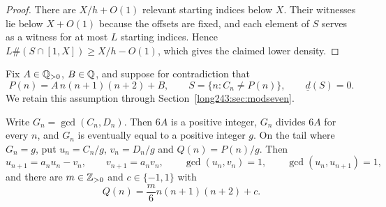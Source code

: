 \documentclass[11pt]{article}
\begin{document}
\begin{proof}
There are $X/h+O(1)$ relevant starting indices below $X$. Their witnesses
lie below $X+O(1)$ because the offsets are fixed, and each element of $S$
serves as a witness for at most $L$ starting indices. Hence
$L\#(S\cap[1,X])\ge X/h-O(1)$, which gives the claimed lower density.
\end{proof}

Fix $A\in\mathbb{Q}_{>0}$, $B\in\mathbb{Q}$, and suppose for contradiction that
\[
 P(n)=A\,n(n+1)(n+2)+B,
 \qquad S=\{n:C_n\ne P(n)\},
 \qquad \underline d(S)=0 .
\]
We retain this assumption through Section~\ref{long243:sec:modseven}.

\begin{lemma}\label{long243:res:gcdshape}
Write $G_n=\gcd(C_n,D_n)$.  Then $6A$ is a positive integer, $G_n$ divides
$6A$ for every $n$, and $G_n$ is eventually equal to a positive integer
$g$.  On the tail where $G_n=g$, put $u_n=C_n/g$, $v_n=D_n/g$ and
$Q(n)=P(n)/g$.  Then
\begin{equation}\label{long243:eq:primitivetail}
 u_{n+1}=a_nu_n-v_n,\qquad v_{n+1}=a_nv_n,\qquad \gcd(u_n,v_n)=1,
 \qquad\gcd(u_n,u_{n+1})=1,
\end{equation}
and there are $m\in\mathbb{Z}_{>0}$ and $c\in\{-1,1\}$ with
\begin{equation}\label{long243:eq:Qmc}
 Q(n)=\frac m6n(n+1)(n+2)+c .
\end{equation}
\end{lemma}
\end{document}
